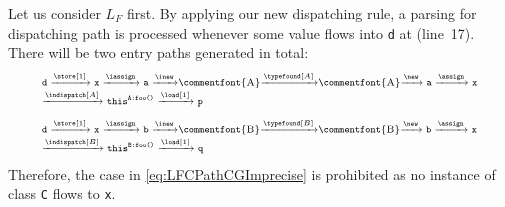 Let us consider $L_F$ first. By applying our new dispatching rule, a parsing for dispatching path is processed whenever some value flows into \texttt{d} at  (line~17). There will be two entry paths generated in total:
\begin{equation}
  \centering
\label{eq:ParmPathI}
\begin{tabular}{l} \scriptsize
$\texttt{d}\xrightarrow{\store[1]}\texttt{x}
\xrightarrow{\iassign}\texttt{a}
\xrightarrow{\inew}$\commentfont{A}$\xrightarrow{\typefound[A]}$\commentfont{A}$\xrightarrow{\new}\texttt{a}\xrightarrow{\assign}\texttt{x}$\\\scriptsize
$\xrightarrow{\indispatch[A]}\texttt{this}^\texttt{A:foo()}\xrightarrow{\load[1]}\texttt{p}$
\end{tabular}
\end{equation}
\begin{equation}
  \centering
\label{eq:ParmPathII}
\begin{tabular}{l} \scriptsize
$\texttt{d}\xrightarrow{\store[1]}\texttt{x}
\xrightarrow{\iassign}\texttt{b}
\xrightarrow{\inew}$\commentfont{B}$\xrightarrow{\typefound[B]}$\commentfont{B}$\xrightarrow{\new}\texttt{b}\xrightarrow{\assign}\texttt{x}$\\\scriptsize
$\xrightarrow{\indispatch[B]}\texttt{this}^\texttt{B:foo()}\xrightarrow{\load[1]}\texttt{q}$
\end{tabular}
\end{equation}
Therefore, the case in \cref{eq:LFCPathCGImprecise} is prohibited as no instance of class \texttt{C} flows to \texttt{x}.


